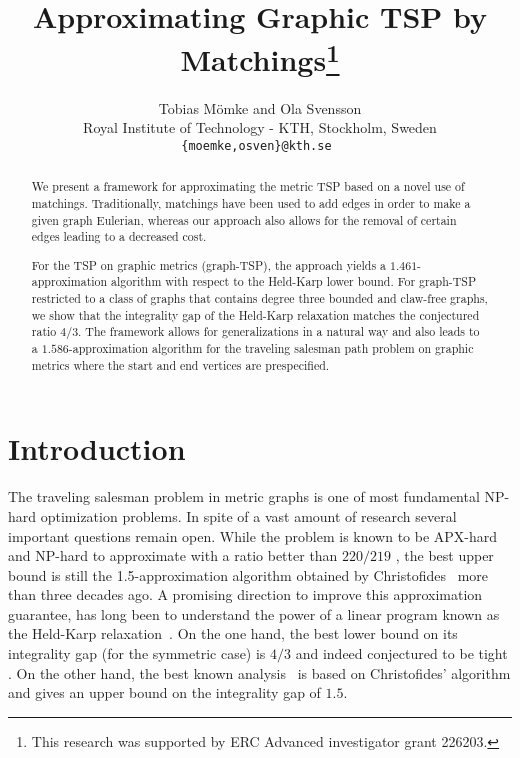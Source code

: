 \documentclass[letterpaper,11pt]{article}
\title{\vspace{-1cm}Approximating Graphic TSP by Matchings\thanks{This research
was supported by ERC Advanced investigator grant 226203.}}
\author{Tobias M\"{o}mke and Ola Svensson \\
 Royal Institute of Technology - KTH, Stockholm, Sweden \\
  {\tt \{moemke,osven\}@kth.se }}
\newcommand{\TSP}{graph-TSP\xspace}
\begin{document}
\maketitle

\begin{abstract}
  We present a framework for approximating the metric TSP based on a
  novel use of matchings. Traditionally, matchings have been used to
  add edges in order to make a given graph Eulerian, whereas our
  approach also allows for the removal of certain edges leading to a
  decreased cost.

  For the TSP on graphic metrics (\TSP), the approach yields a
  $1.461$-approximation algorithm with respect to the
  Held-Karp lower bound. For \TSP restricted to a class of graphs that
  contains degree three bounded and claw-free graphs, we show that the
  integrality gap of the Held-Karp relaxation matches the conjectured
  ratio $4/3$. The framework allows for generalizations in a natural way and
  also leads to a $1.586$-approximation algorithm for the traveling
  salesman path problem on graphic metrics where the start and end vertices are
  prespecified.
\end{abstract}


\section{Introduction}\label{sec:intro}
    The traveling salesman problem in metric graphs is one of most
    fundamental NP-hard optimization problems. In spite of a vast amount
    of research several important questions remain open. While the problem
    is known to be APX-hard and NP-hard to approximate with a ratio better than
    $220/219$ \cite{PV06}, the best upper bound is still the
    1.5-approximation algorithm obtained by Christofides~\cite{Chr76}
    more than three decades ago.
    A promising direction to improve this approximation guarantee, has
    long been to understand the power of a linear program known as the
    Held-Karp relaxation~\cite{HK70}. On the one hand, the best lower
    bound on its integrality gap (for the symmetric case) is $4/3$ and
    indeed conjectured to be tight \cite{Goe95}. On the other hand, the
    best known analysis~\cite{SW90, Wol80} is based on Christofides'
    algorithm and gives an upper bound on the integrality gap of $1.5$.
\end{document}

